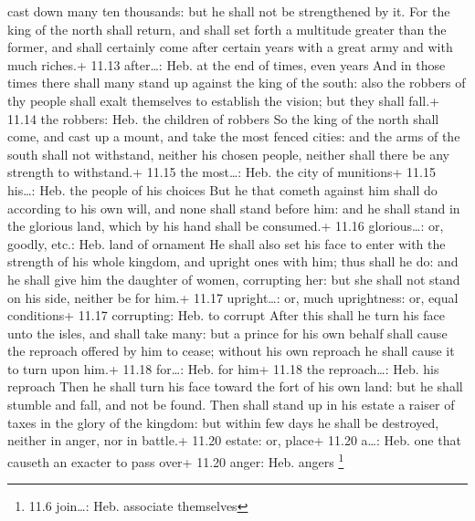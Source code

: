 cast down many ten thousands: but he shall not be strengthened by it.
 For the king of the north shall return, and shall set
forth a multitude greater than the former, and shall certainly come
after certain years with a great army and with much riches.+ 11.13
after\ldots: Heb. at the end of times, even years  And in
those times there shall many stand up against the king of the south:
also the robbers of thy people shall exalt themselves to establish the
vision; but they shall fall.+ 11.14 the robbers: Heb. the children of
robbers  So the king of the north shall come, and cast up a
mount, and take the most fenced cities: and the arms of the south shall
not withstand, neither his chosen people, neither shall there be any
strength to withstand.+ 11.15 the most\ldots: Heb. the city of
munitions+ 11.15 his\ldots: Heb. the people of his choices 
But he that cometh against him shall do according to his own will, and
none shall stand before him: and he shall stand in the glorious land,
which by his hand shall be consumed.+ 11.16 glorious\ldots: or, goodly,
etc.: Heb. land of ornament  He shall also set his face to
enter with the strength of his whole kingdom, and upright ones with him;
thus shall he do: and he shall give him the daughter of women,
corrupting her: but she shall not stand on his side, neither be for
him.+ 11.17 upright\ldots: or, much uprightness: or, equal conditions+
11.17 corrupting: Heb. to corrupt  After this shall he turn
his face unto the isles, and shall take many: but a prince for his own
behalf shall cause the reproach offered by him to cease; without his own
reproach he shall cause it to turn upon him.+ 11.18 for\ldots: Heb. for
him+ 11.18 the reproach\ldots: Heb. his reproach  Then he
shall turn his face toward the fort of his own land: but he shall
stumble and fall, and not be found.  Then shall stand up in
his estate a raiser of taxes in the glory of the kingdom: but within few
days he shall be destroyed, neither in anger, nor in battle.+ 11.20
estate: or, place+ 11.20 a\ldots: Heb. one that causeth an exacter to
pass over+ 11.20 anger: Heb. angers \footnote{11.6 join\ldots: Heb.
  associate themselves}


